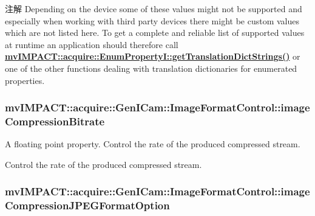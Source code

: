 \begin{DoxyNote}{注解}
Depending on the device some of these values might not be supported and especially when working with third party devices there might be custom values which are not listed here. To get a complete and reliable list of supported values at runtime an application should therefore call {\bfseries \hyperlink{classmv_i_m_p_a_c_t_1_1acquire_1_1_enum_property_i_a0ba6ccbf5ee69784d5d0b537924d26b6}{mv\+I\+M\+P\+A\+C\+T\+::acquire\+::\+Enum\+Property\+I\+::get\+Translation\+Dict\+Strings()}} or one of the other functions dealing with translation dictionaries for enumerated properties. 
\end{DoxyNote}
\hypertarget{classmv_i_m_p_a_c_t_1_1acquire_1_1_gen_i_cam_1_1_image_format_control_abae73448ae7d81315f5094df43f6d098}{
\subsubsection[{image\+Compression\+Bitrate}]{ mv\+I\+M\+P\+A\+C\+T\+::acquire\+::\+Gen\+I\+Cam\+::\+Image\+Format\+Control\+::image\+Compression\+Bitrate}}\label{classmv_i_m_p_a_c_t_1_1acquire_1_1_gen_i_cam_1_1_image_format_control_abae73448ae7d81315f5094df43f6d098}


A floating point property. Control the rate of the produced compressed stream. 

Control the rate of the produced compressed stream. \hypertarget{classmv_i_m_p_a_c_t_1_1acquire_1_1_gen_i_cam_1_1_image_format_control_a44d90d8a836cb87ea44db50f47d53dd5}{
\subsubsection[{image\+Compression\+J\+P\+E\+G\+Format\+Option}]{ mv\+I\+M\+P\+A\+C\+T\+::acquire\+::\+Gen\+I\+Cam\+::\+Image\+Format\+Control\+::image\+Compression\+J\+P\+E\+G\+Format\+Option}}\label{classmv_i_m_p_a_c_t_1_1acquire_1_1_gen_i_cam_1_1_image_format_control_a44d90d8a836cb87ea44db50f47d53dd5}


